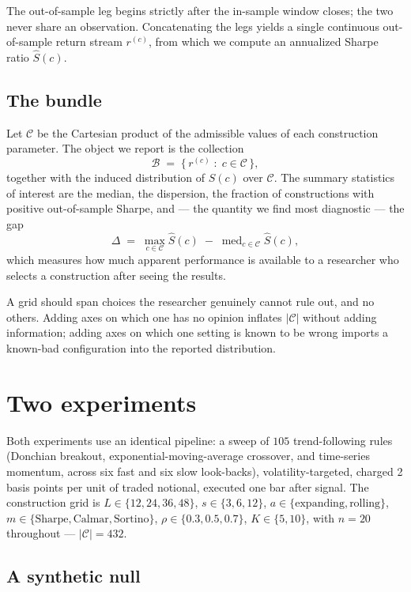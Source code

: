 \documentclass[11pt,a4paper]{article}
\begin{document}
The out-of-sample leg begins strictly after the in-sample window closes; the two
never share an observation. Concatenating the legs yields a single continuous
out-of-sample return stream $r^{(c)}$, from which we compute an annualized
Sharpe ratio $\widehat{S}(c)$.

\subsection{The bundle}

Let $\mathcal{C}$ be the Cartesian product of the admissible values of each
construction parameter. The object we report is the collection
\[
\mathcal{B} \;=\; \big\{\, r^{(c)} \;:\; c \in \mathcal{C} \,\big\},
\]
together with the induced distribution of $\widehat{S}(c)$ over $\mathcal{C}$.
The summary statistics of interest are the median, the dispersion, the fraction
of constructions with positive out-of-sample Sharpe, and --- the quantity we
find most diagnostic --- the gap
\[
\Delta \;=\; \max_{c \in \mathcal{C}} \widehat{S}(c) \;-\;
              \operatorname{med}_{c \in \mathcal{C}} \widehat{S}(c),
\]
which measures how much apparent performance is available to a researcher who
selects a construction after seeing the results.

A grid should span choices the researcher genuinely cannot rule out, and no
others. Adding axes on which one has no opinion inflates $|\mathcal{C}|$ without
adding information; adding axes on which one setting is known to be wrong
imports a known-bad configuration into the reported distribution.

\section{Two experiments}

Both experiments use an identical pipeline: a sweep of $105$ trend-following
rules (Donchian breakout, exponential-moving-average crossover, and time-series
momentum, across six fast and six slow look-backs), volatility-targeted, charged
2 basis points per unit of traded notional, executed one bar after signal. The
construction grid is
$L \in \{12,24,36,48\}$, $s \in \{3,6,12\}$, $a \in \{\text{expanding},
\text{rolling}\}$, $m \in \{\text{Sharpe}, \text{Calmar}, \text{Sortino}\}$,
$\rho \in \{0.3,0.5,0.7\}$, $K \in \{5,10\}$, with $n = 20$ throughout ---
$|\mathcal{C}| = 432$.

\subsection{A synthetic null}
\end{document}
